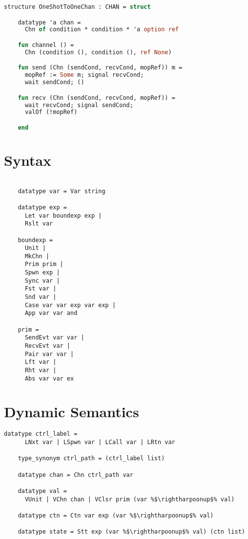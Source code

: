 \documentclass{article}
\begin{document}
\begin{lstlisting}[language=ML, style=codestyle1]
  structure OneShotToOneChan : CHAN = struct

    datatype 'a chan =
      Chn of condition * condition * 'a option ref

    fun channel () =
      Chn (condition (), condition (), ref None)

    fun send (Chn (sendCond, recvCond, mopRef)) m =
      mopRef := Some m; signal recvCond;  
      wait sendCond; ()

    fun recv (Chn (sendCond, recvCond, mopRef)) =
      wait recvCond; signal sendCond;
      valOf (!mopRef)

    end
  \end{lstlisting}


\section{Syntax}

  \begin{lstlisting}[style=codestyle1]

    datatype var = Var string

    datatype exp = 
      Let var boundexp exp |
      Rslt var

    boundexp =
      Unit |
      MkChn |
      Prim prim |
      Spwn exp |
      Sync var |
      Fst var |
      Snd var |
      Case var var exp var exp |
      App var var and

    prim = 
      SendEvt var var |
      RecvEvt var |
      Pair var var |
      Lft var |
      Rht var |
      Abs var var ex

  \end{lstlisting}



\section{Dynamic Semantics}


  \begin{lstlisting}[style=codestyle1, escapechar=\%]
    datatype ctrl_label = 
      LNxt var | LSpwn var | LCall var | LRtn var

    type_synonym ctrl_path = (ctrl_label list)

    datatype chan = Chn ctrl_path var

    datatype val = 
      VUnit | VChn chan | VClsr prim (var %$\rightharpoonup$% val)

    datatype ctn = Ctn var exp (var %$\rightharpoonup$% val)  

    datatype state = Stt exp (var %$\rightharpoonup$% val) (ctn list) 

    \end{lstlisting}
\end{document}
